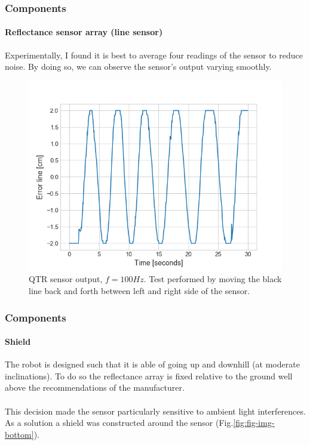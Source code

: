 \documentclass[10pt]{beamer}
\begin{document}
\begin{frame}
\frametitle{Components}
\framesubtitle{Reflectance sensor array (line sensor)}
Experimentally, I found it is best to average four readings of the sensor to reduce noise. By doing so, we can observe the sensor's output varying smoothly.
\vspace*{-3mm}
\begin{figure}[hbtp]
\centering
\label{fig:flow-qtr}
\includegraphics[scale=0.45]{figures/qtr-flow.png}
\vspace*{-2mm}
\caption{QTR sensor output, $f=100Hz$. Test performed by moving the black line back and forth between left and right side of the sensor.}
\end{figure}
\end{frame}


\begin{frame}
\frametitle{Components}
\framesubtitle{Shield}
The robot is designed such that it is able of going up and downhill (at moderate inclinations). To do so the reflectance array is fixed relative to the ground well above the recommendations of the manufacturer. \\~\\
This decision made the sensor particularly sensitive to ambient light interferences. As a solution a shield was constructed around the sensor (Fig.\ref{fig:fig-img-bottom}).
\end{frame}

\end{document}

